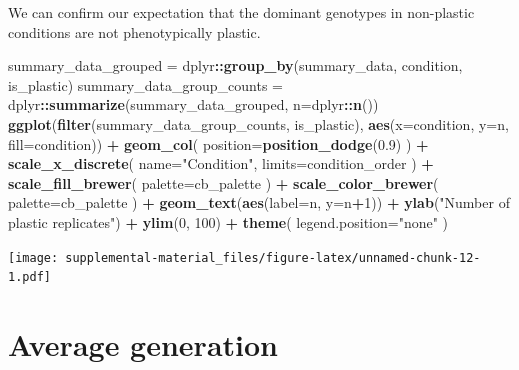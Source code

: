 \documentclass[]{book}
\newenvironment{Shaded}{\begin{snugshade}}{\end{snugshade}}
\newcommand{\DataTypeTok}[1]{\textcolor[rgb]{0.13,0.29,0.53}{#1}}
\newcommand{\DecValTok}[1]{\textcolor[rgb]{0.00,0.00,0.81}{#1}}
\newcommand{\FloatTok}[1]{\textcolor[rgb]{0.00,0.00,0.81}{#1}}
\newcommand{\KeywordTok}[1]{\textcolor[rgb]{0.13,0.29,0.53}{\textbf{#1}}}
\newcommand{\NormalTok}[1]{#1}
\newcommand{\OperatorTok}[1]{\textcolor[rgb]{0.81,0.36,0.00}{\textbf{#1}}}
\newcommand{\StringTok}[1]{\textcolor[rgb]{0.31,0.60,0.02}{#1}}
\begin{document}
We can confirm our expectation that the dominant genotypes in non-plastic conditions are not phenotypically plastic.

\begin{Shaded}
\begin{Highlighting}[]
\NormalTok{summary_data_grouped =}\StringTok{ }\NormalTok{dplyr}\OperatorTok{::}\KeywordTok{group_by}\NormalTok{(summary_data, condition, is_plastic)}
\NormalTok{summary_data_group_counts =}\StringTok{ }\NormalTok{dplyr}\OperatorTok{::}\KeywordTok{summarize}\NormalTok{(summary_data_grouped, }\DataTypeTok{n=}\NormalTok{dplyr}\OperatorTok{::}\KeywordTok{n}\NormalTok{())}
\KeywordTok{ggplot}\NormalTok{(}\KeywordTok{filter}\NormalTok{(summary_data_group_counts, is_plastic), }\KeywordTok{aes}\NormalTok{(}\DataTypeTok{x=}\NormalTok{condition, }\DataTypeTok{y=}\NormalTok{n, }\DataTypeTok{fill=}\NormalTok{condition)) }\OperatorTok{+}
\StringTok{  }\KeywordTok{geom_col}\NormalTok{(}
    \DataTypeTok{position=}\KeywordTok{position_dodge}\NormalTok{(}\FloatTok{0.9}\NormalTok{)}
\NormalTok{  ) }\OperatorTok{+}
\StringTok{  }\KeywordTok{scale_x_discrete}\NormalTok{(}
    \DataTypeTok{name=}\StringTok{"Condition"}\NormalTok{,}
    \DataTypeTok{limits=}\NormalTok{condition_order}
\NormalTok{  ) }\OperatorTok{+}
\StringTok{  }\KeywordTok{scale_fill_brewer}\NormalTok{(}
    \DataTypeTok{palette=}\NormalTok{cb_palette}
\NormalTok{  ) }\OperatorTok{+}
\StringTok{  }\KeywordTok{scale_color_brewer}\NormalTok{(}
    \DataTypeTok{palette=}\NormalTok{cb_palette}
\NormalTok{  ) }\OperatorTok{+}
\StringTok{  }\KeywordTok{geom_text}\NormalTok{(}\KeywordTok{aes}\NormalTok{(}\DataTypeTok{label=}\NormalTok{n, }\DataTypeTok{y=}\NormalTok{n}\OperatorTok{+}\DecValTok{1}\NormalTok{)) }\OperatorTok{+}
\StringTok{  }\KeywordTok{ylab}\NormalTok{(}\StringTok{"Number of plastic replicates"}\NormalTok{) }\OperatorTok{+}
\StringTok{  }\KeywordTok{ylim}\NormalTok{(}\DecValTok{0}\NormalTok{, }\DecValTok{100}\NormalTok{) }\OperatorTok{+}
\StringTok{  }\KeywordTok{theme}\NormalTok{(}
    \DataTypeTok{legend.position=}\StringTok{"none"}
\NormalTok{  )}
\end{Highlighting}
\end{Shaded}

\texttt{[image: supplemental-material\_files/figure-latex/unnamed-chunk-12-1.pdf]}

\hypertarget{average-generation}{%
\section{Average generation}\label{average-generation}}
\end{document}
